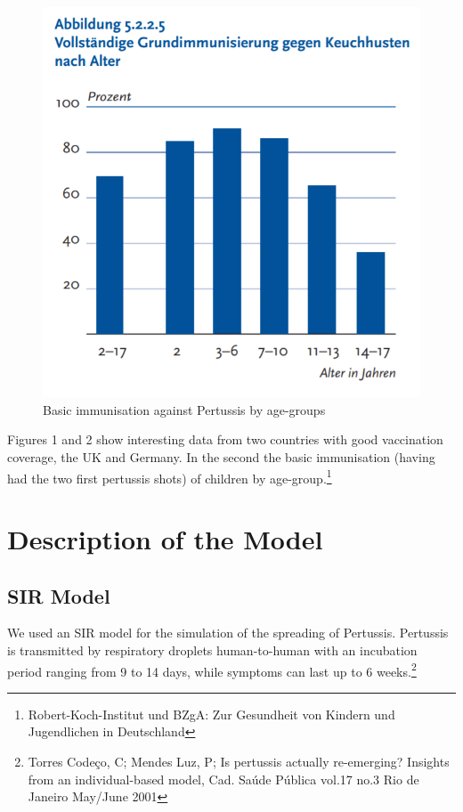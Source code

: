 \documentclass[11pt]{article}
\begin{document}
\begin{figure}
\begin{minipage}{.6\textwidth}
\end{minipage}%
\begin{minipage}{.4\textwidth}
  \centering
  \includegraphics[height=1\linewidth]{grundimmodeutschlandpertussis}
  \caption{Basic immunisation against Pertussis by age-groups}
  \label{fig:2}
 
\end{minipage}%
\end{figure}

Figures 1 and 2 show interesting data from two countries with good vaccination coverage, the UK and Germany. In the second the basic immunisation (having had the two first pertussis shots) of children by age-group.\footnote{Robert-Koch-Institut und BZgA: Zur Gesundheit von Kindern und Jugendlichen in Deutschland}

\section{Description of the Model}

\subsection{SIR Model}

We used an SIR model for the simulation of the spreading of Pertussis. Pertussis is transmitted by respiratory droplets human-to-human with an incubation period ranging from 9 to 14 days, while symptoms can last up to 6 weeks.\footnote{Torres Codeço, C; Mendes Luz, P; Is pertussis actually re-emerging? Insights from an individual-based model, Cad. Saúde Pública vol.17 no.3 Rio de Janeiro May/June 2001}
\end{document}
